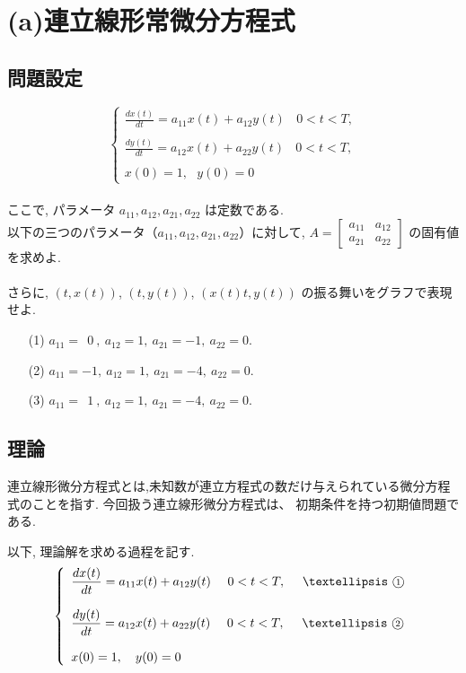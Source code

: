 \documentclass[11pt]{jsarticle}
\begin{document}
\clearpage
\section{(a)連立線形常微分方程式}
\subsection{問題設定}
\[\left\{ 
\begin{array}{l}
\displaystyle \frac{dx(t)}{dt} = a_{11}x(t) + a_{12}y(t)\ \ \ \ 0 < t < T, \\ \\
\displaystyle \frac{dy(t)}{dt} = a_{12}x(t) + a_{22}y(t)\ \ \ \ 0 < t < T, \\ \\
x(0) = 1,\ \ \  y(0) = 0
\end{array}
\right.\]
\\
ここで, パラメータ $a_{11}, a_{12}, a_{21}, a_{22}$ は定数である. \\
以下の三つのパラメータ（$a_{11}, a_{12}, a_{21}, a_{22}$）に対して, 
$A = \begin{bmatrix} a_{11} & a_{12} \\ a_{21} & a_{22} \end{bmatrix}$ の固有値を求めよ. \\
\\
さらに, $(t, x(t))$, $(t, y(t))$, $(x(t)t, y(t))$ の振る舞いをグラフで表現せよ. 

\begin{itemize}
\item[(1)] $a_{11} = \ \ 0\ , \ a_{12} = 1, \ a_{21} = -1, \ a_{22} = 0$.
\item[(2)] $a_{11} = -1, \ a_{12} = 1, \ a_{21} = -4, \ a_{22} = 0$.
\item[(3)] $a_{11} = \ \ 1\ , \ a_{12} = 1, \ a_{21} = -4, \ a_{22} = 0$.
\end{itemize}

\subsection{理論}
連立線形微分方程式とは,未知数が連立方程式の数だけ与えられている微分方程式のことを指す. 
今回扱う連立線形微分方程式は、 初期条件を持つ初期値問題である. \par
以下, 理論解を求める過程を記す. \\
\[\left\{ 
\begin{array}{l}
\displaystyle \frac{dx(t)}{dt} = a_{11}x(t) + a_{12}y(t)\ \ \ \ 0 < t < T,\ \ \ \ …\ $\textcircled{\scriptsize1}$ \\ \\
\displaystyle \frac{dy(t)}{dt} = a_{12}x(t) + a_{22}y(t)\ \ \ \ 0 < t < T,\ \ \ \ …\ $\textcircled{\scriptsize2}$ \\ \\
x(0) = 1,\ \ \  y(0) = 0
\end{array}
\right.\]
\end{document}
